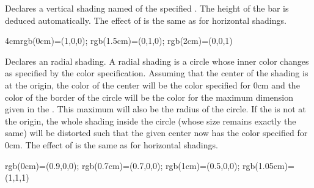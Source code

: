 \begin{command}{\pgfdeclareverticalshading{}}
   Declares a vertical shading named  of the
   specified . The height of the bar is deduced
   automatically. The effect of  is the same as for
   horizontal shadings.

\begin{codeexample}[]
  {4cm}{rgb(0cm)=(1,0,0); rgb(1.5cm)=(0,1,0); rgb(2cm)=(0,0,1)}
\end{codeexample}
\end{command}


\begin{command}{\pgfdeclareradialshading{}}
  Declares an radial shading. A radial shading is a circle whose inner
  color changes as specified by the color specification. Assuming that
  the center of the shading is at the origin, the color of the center
  will be the color specified for 0cm and the color of the border of
  the circle will be the color for the maximum dimension given in
  the . This maximum will also be the radius of
  the circle. If the  is not at the 
  origin, the whole shading inside the circle (whose size remains
  exactly the same) will be distorted such that the given center now
  has the color specified for 0cm. The effect of  is
  the same as for horizontal shadings. 

\begin{codeexample}[]  
%
  {rgb(0cm)=(0.9,0,0);
   rgb(0.7cm)=(0.7,0,0);
   rgb(1cm)=(0.5,0,0);
   rgb(1.05cm)=(1,1,1)}
\end{codeexample}
\end{command}


